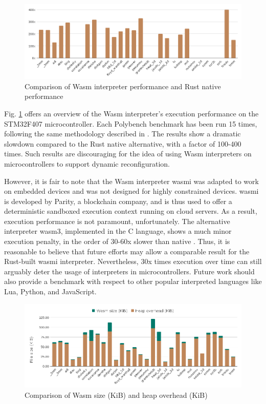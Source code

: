 \begin{figure}[ht]
\centering
\includegraphics[width=\columnwidth]{figures/b-wasmi-4}
\caption{Comparison of Wasm interpreter performance and Rust native performance \label{fig:b-wasmi-4}}
\end{figure}

Fig. \ref{fig:b-wasmi-4} offers an overview of the Wasm interpreter's execution performance on the STM32F407 microcontroller. Each Polybench benchmark has been run 15 times, following the same methodology described in \cite{wasm3-performance}. The results show a dramatic slowdown compared to the Rust native alternative, with a factor of 100-400 times. Such results are discouraging for the idea of using Wasm interpreters on microcontrollers to support dynamic reconfiguration.

However, it is fair to note that the Wasm interpreter wasmi \cite{wasmi} was adapted to work on embedded devices and was not designed for highly constrained devices. wasmi is developed by Parity, a blockchain company, and is thus used to offer a deterministic sandboxed execution context running on cloud servers. As a result, execution performance is not paramount, unfortunately. The alternative interpreter wasm3, implemented in the C language, shows a much minor execution penalty, in the order of 30-60x slower than native \cite{peach2020ewasm}. Thus, it is reasonable to believe that future efforts may allow a comparable result for the Rust-built wasmi interpreter. Nevertheless, 30x times execution over time can still arguably deter the usage of interpreters in microcontrollers. Future work should also provide a benchmark with respect to other popular interpreted languages like Lua, Python, and JavaScript.

\begin{figure}[ht]
\centering
\includegraphics[width=\columnwidth]{figures/b-wasmi-1}
\caption{Comparison of Wasm size (KiB) and heap overhead (KiB) \label{fig:b-wasmi-1}}
\end{figure}


